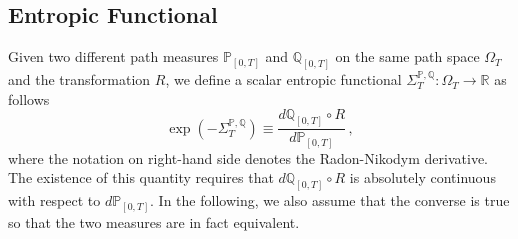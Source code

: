 \documentclass[a4paper,11pt]{article}
\numberwithin{equation}{section}
\begin{document}
\subsection{Entropic Functional}
\label{subsec:entropic_functional}
  
Given two different path measures $\mathbb{P}_{\left[0,T\right]}$ and $\mathbb{Q}_{\left[0,T\right]}$ on the same path space $\Omega_T$ and the transformation $R$, we define a scalar entropic functional $\varSigma_{T}^{\mathbb{P},\mathbb{Q}} : \Omega_T \to \mathbb{R}$ as follows
\begin{equation}\label{eq:AF}
\exp\left(-\varSigma_{T}^{\mathbb{P},\mathbb{Q}}\right)  \equiv\frac{d\mathbb{Q}_{\left[0,T\right]} \circ R }{d\mathbb{P}_{\left[0,T\right]}} \, ,
\end{equation}
where the notation on right-hand side denotes the Radon-Nikodym derivative. The existence of this quantity requires that $d\mathbb{Q}_{\left[0,T\right]}\circ R$ is absolutely continuous with respect to $d\mathbb{P}_{\left[0,T\right]}$. In the following, we also assume that the converse is true so that the two measures are in fact equivalent.
\end{document}
